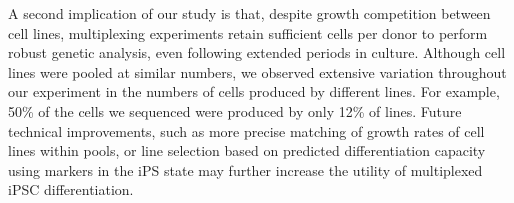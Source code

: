 


A second implication of our study is that, despite growth competition between cell lines, multiplexing experiments retain sufficient cells per donor to perform robust genetic analysis, even following extended periods in culture. 
Although cell lines were pooled at similar numbers, we observed extensive variation throughout our experiment in the numbers of cells produced by different lines. 
For example, 50\% of the cells we sequenced were produced by only 12\% of lines.
Future technical improvements, such as more precise matching of growth rates of cell lines within pools, or line selection based on predicted differentiation capacity using markers in the iPS state may further increase the utility of multiplexed iPSC differentiation.\\

